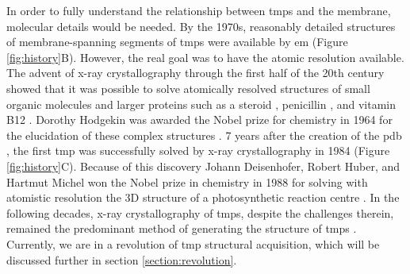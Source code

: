 In order to fully understand the relationship between \gls{tmp}s and the membrane, molecular details would be needed.
By the 1970s, reasonably detailed structures of membrane\--spanning segments of \gls{tmp}s were available by \gls{em} \cite{Henderson1975} (Figure \ref{fig:history}B).
However, the real goal was to have the atomic resolution available.
The advent of x\--ray crystallography through the first half of the 20th century showed that it was possible to solve atomically resolved structures of small organic molecules \cite{Lonsdale1928, Dickinson1923} and larger proteins such as a steroid \cite{Carlisle1945}, penicillin \cite{Hodgekin1949}, and vitamin B12 \cite{HODGKIN1955}.
Dorothy Hodgekin was awarded the Nobel prize for chemistry in 1964 for the elucidation of these complex structures \cite{NobelMedia2018a}.
7 years after the creation of the \gls{pdb} \cite{Bernstein1978}, the first \gls{tmp} was successfully solved by x\--ray crystallography in 1984 \cite{Deisenhofer1984} (Figure \ref{fig:history}C).
Because of this discovery Johann Deisenhofer, Robert Huber, and Hartmut Michel won the Nobel prize in chemistry in 1988 for solving with atomistic resolution the 3D structure of a photosynthetic reaction centre \cite{NobelMedia2018}.
In the following decades, x\--ray crystallography of \gls{tmp}s, despite the challenges therein, remained the predominant method of generating the structure of \gls{tmp}s \cite{Carpenter2008}.
Currently, we are in a revolution of \gls{tmp} structural acquisition, which will be discussed further in section \ref{section:revolution}.

